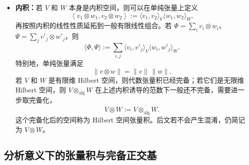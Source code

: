\documentclass[UTF8,a4paper,11pt,openany]{ctexbook}
\begin{document}
\begin{itemize}
        \item \textbf{内积：}若 $V$ 和 $W$ 本身是内积空间，则可以在单纯张量上定义
    \begin{equation}
        \left\langle
            v_1\otimes w_1,
            v_2\otimes w_2
        \right\rangle
        :=
        \langle v_1,v_2\rangle_V
        \langle w_1,w_2\rangle_W.
    \end{equation}
    再按照内积的线性性质延拓到一般有限线性组合。若
    $\Phi=\sum_i v_i\otimes w_i$、$\Psi=\sum_j v'_j\otimes w'_j$，则
    \begin{equation}
        \langle\Phi,\Psi\rangle
        :=
        \sum_{i,j}
        \langle v_i,v'_j\rangle_V
        \langle w_i,w'_j\rangle_W.
    \end{equation}
    特别地，单纯张量满足
    \begin{equation}
        \|v\otimes w\|
        =
        \|v\|\,\|w\|.
    \end{equation}
    若 $V$ 和 $W$ 是有限维 Hilbert 空间，则代数张量积已经完备；若它们是无限维 Hilbert 空间，则 $V\otimes_{\mathrm{alg}}W$ 在上述内积诱导的范数下一般还不完备，需要进一步取完备化，
    \begin{equation}
        V\widehat{\otimes}W
        :=
        \overline{V\otimes_{\mathrm{alg}}W}.
    \end{equation}
    这个完备化后的空间称为 Hilbert 空间张量积。后文若不会产生混淆，仍简记为 $V\otimes W$。
\end{itemize}

\subsection{分析意义下的张量积与完备正交基}
\end{document}
